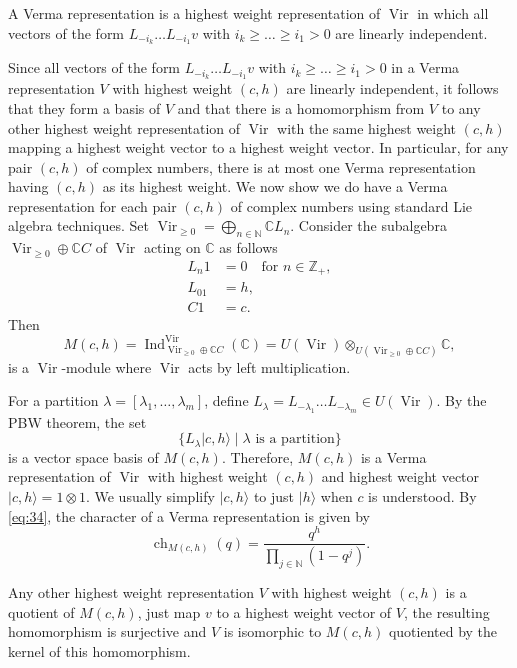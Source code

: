 \documentclass[a4paper, 12pt, reqno]{amsart}
\theoremstyle{remark}
\numberwithin{equation}{subsection}
\DeclareMathOperator{\Vir}{Vir}
\DeclareMathOperator{\ch}{ch}
\DeclareMathOperator{\Ind}{Ind}
\begin{document}
A Verma representation is a highest weight representation of $\Vir$ in which all vectors of the form $L_{-i_k}\dots L_{-i_1}v$ with $i_k \ge \dots \ge i_1 > 0$ are linearly independent.

Since all vectors of the form $L_{-i_k}\dots L_{-i_1}v$ with $i_k \ge \dots \ge i_1 > 0$ in a Verma representation $V$ with highest weight $(c, h)$ are linearly independent, it follows that they form a basis of $V$ and that there is a homomorphism from $V$ to any other highest weight representation of $\Vir$ with the same highest weight $(c, h)$ mapping a highest weight vector to a highest weight vector.
In particular, for any pair $(c, h)$ of complex numbers, there is at most one Verma representation having $(c, h)$ as its highest weight.
We now show we do have a Verma representation for each pair $(c, h)$ of complex numbers using standard Lie algebra techniques.
Set $\Vir_{\ge 0} = \bigoplus_{n \in \mathbb{N}}\mathbb{C}L_n$.
Consider the subalgebra $\Vir_{\ge 0} \oplus \mathbb{C}C$ of $\Vir$ acting on $\mathbb{C}$ as follows
\begin{align*}
  L_n1 &= 0 \quad \text{for }n \in \mathbb{Z}_+, \\
  L_01 &= h, \\
  C1 &= c.
\end{align*}
Then
\begin{equation*}
  M(c, h) = \Ind^{\Vir}_{\Vir_{\ge 0} \oplus \mathbb{C}C}(\mathbb{C}) = U(\Vir) \otimes_{U(\Vir_{\ge 0} \oplus \mathbb{C}C)} \mathbb{C},
\end{equation*}
is a $\Vir$-module where $\Vir$ acts by left multiplication.

For a partition $\lambda = [\lambda_1, \dots, \lambda_m]$, define $L_{\lambda} = L_{-\lambda_1}\dots L_{-\lambda_m} \in U(\Vir)$.
By the PBW theorem, the set
\begin{equation*}
  \{L_\lambda|c,h\rangle \mid \lambda\text{ is a partition}\}
\end{equation*}
is a vector space basis of $M(c, h)$.
Therefore, $M(c, h)$ is a Verma representation of $\Vir$ with highest weight $(c, h)$ and highest weight vector $|c, h\rangle = 1\otimes1$.
We usually simplify $|c, h\rangle$ to just $|h\rangle$ when $c$ is understood.
By \eqref{eq:34}, the character of a Verma representation is given by
\begin{equation*}
  \ch_{M(c, h)}(q) = \frac{q^h}{\prod_{j \in \mathbb{N}}(1 - q^j)}.
\end{equation*}

Any other highest weight representation $V$ with highest weight $(c, h)$ is a quotient of $M(c, h)$, just map $v$ to a highest weight vector of $V$, the resulting homomorphism is surjective and $V$ is isomorphic to $M(c, h)$ quotiented by the kernel of this homomorphism.
\end{document}

